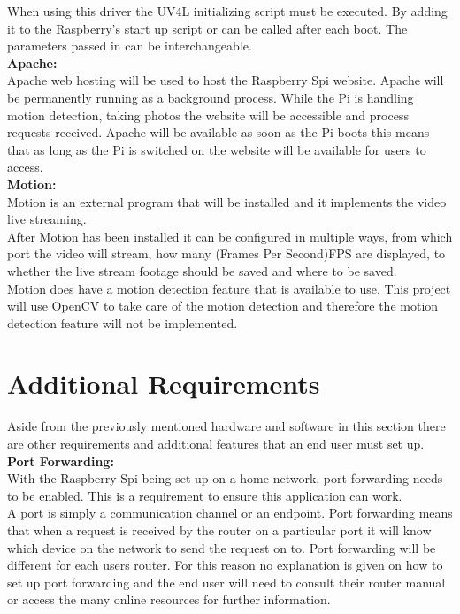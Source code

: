 \documentclass[12pt]{report}
\begin{document}
When using this driver the UV4L initializing script must be executed. By adding it to the Raspberry's start up script or can be called after each boot. The parameters passed in can be interchangeable. \\


\noindent
{\bf Apache:}\\
\break
Apache web hosting will be used to host the Raspberry Spi website. Apache will be permanently running as a background process. While the Pi is handling motion detection, taking photos the website will be accessible and process requests received. Apache will be available as soon as the Pi boots this means that as long as the Pi is switched on the website will be available for users to access.\\ 

\noindent
{\bf Motion:}\\
\break
Motion is an external program that will be installed and it implements the video live streaming.\\

After Motion has been installed it can be configured in multiple ways, from which port the video will stream, how many (Frames Per Second)FPS are displayed, to whether the live stream footage should be saved and where to be saved.\\

Motion does have a motion detection feature that is available to use. This project will use OpenCV to take care of the motion detection and therefore the motion detection feature will not be implemented.\\

\clearpage
\section{Additional Requirements}	
\label{sec:additional}
Aside from the previously mentioned hardware and software in this section there are other requirements and additional features that an end user must set up.\\

\noindent
{\bf Port Forwarding:}\\
\break
With the Raspberry Spi being set up on a home network, port forwarding needs to be enabled. This is a requirement to ensure this application can work.\\

A port is simply a communication channel or an endpoint. Port forwarding means that when a request is received by the router on a particular port it will know which device on the network to send the request on to. Port forwarding will be different for each users router. For this reason no explanation is given on how to set up port forwarding and the end user will need to consult their router manual or access the many online resources for further information.\\
\end{document}

